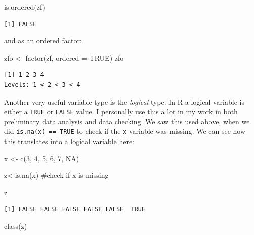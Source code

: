 \documentclass[
  letterpaper,
  DIV=11,
  numbers=noendperiod]{scrreprt}
\newenvironment{Shaded}{\begin{snugshade}}{\end{snugshade}}
\newcommand{\AttributeTok}[1]{\textcolor[rgb]{0.40,0.45,0.13}{#1}}
\newcommand{\CommentTok}[1]{\textcolor[rgb]{0.37,0.37,0.37}{#1}}
\newcommand{\ConstantTok}[1]{\textcolor[rgb]{0.56,0.35,0.01}{#1}}
\newcommand{\DecValTok}[1]{\textcolor[rgb]{0.68,0.00,0.00}{#1}}
\newcommand{\FunctionTok}[1]{\textcolor[rgb]{0.28,0.35,0.67}{#1}}
\newcommand{\NormalTok}[1]{\textcolor[rgb]{0.00,0.23,0.31}{#1}}
\newcommand{\OtherTok}[1]{\textcolor[rgb]{0.00,0.23,0.31}{#1}}
\begin{document}
\begin{Shaded}
\begin{Highlighting}[]
\FunctionTok{is.ordered}\NormalTok{(zf)}
\end{Highlighting}
\end{Shaded}

\begin{verbatim}
[1] FALSE
\end{verbatim}

and as an ordered factor:

\begin{Shaded}
\begin{Highlighting}[]
\NormalTok{zfo }\OtherTok{\textless{}{-}} \FunctionTok{factor}\NormalTok{(zf, }
              \AttributeTok{ordered =} \ConstantTok{TRUE}\NormalTok{)}
\NormalTok{zfo}
\end{Highlighting}
\end{Shaded}

\begin{verbatim}
[1] 1 2 3 4
Levels: 1 < 2 < 3 < 4
\end{verbatim}

Another very useful variable type is the \emph{logical} type. In R a
logical variable is either a \texttt{TRUE} or \texttt{FALSE} value. I
personally use this a lot in my work in both preliminary data analysis
and data checking. We saw this used above, when we did
\texttt{is.na(x)\ ==\ TRUE} to check if the \texttt{x} variable was
missing. We can see how this translates into a logical variable here:

\begin{Shaded}
\begin{Highlighting}[]
\NormalTok{x }\OtherTok{\textless{}{-}} \FunctionTok{c}\NormalTok{(}\DecValTok{3}\NormalTok{, }\DecValTok{4}\NormalTok{, }\DecValTok{5}\NormalTok{, }\DecValTok{6}\NormalTok{, }\DecValTok{7}\NormalTok{, }\ConstantTok{NA}\NormalTok{)}

\NormalTok{z}\OtherTok{\textless{}{-}}\FunctionTok{is.na}\NormalTok{(x) }\CommentTok{\#check if x is missing}

\NormalTok{z}
\end{Highlighting}
\end{Shaded}

\begin{verbatim}
[1] FALSE FALSE FALSE FALSE FALSE  TRUE
\end{verbatim}

\begin{Shaded}
\begin{Highlighting}[]
\FunctionTok{class}\NormalTok{(z)}
\end{Highlighting}
\end{Shaded}
\end{document}
